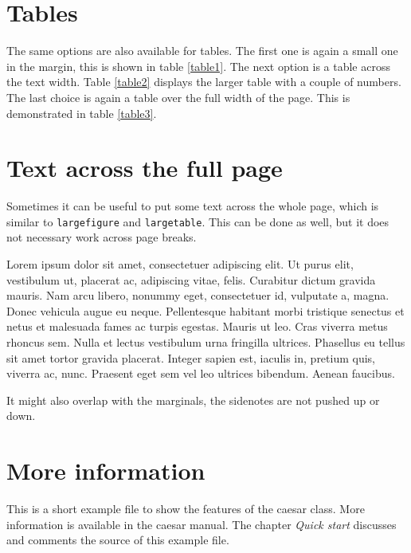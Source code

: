 \documentclass[]{caesar_book}
\begin{document}
\section{Tables}
The same options are also available for tables.%
%
%
The first one is again a small one in the margin, this is shown in table \ref{table1}. The next option is a table across the text width. %
%
%
Table \ref{table2} displays the larger table with a couple of numbers. The last choice is again a table over the full width of the page. This is demonstrated in table \ref{table3}.
%
%
%
\section{Text across the full page}
Sometimes it can be useful to put some text across the whole page, which is similar to \texttt{largefigure} and \texttt{largetable}. This can be done as well, but it does not necessary work across page breaks.

\begin{fullwidth}
Lorem ipsum dolor sit amet, consectetuer adipiscing elit. Ut purus elit, vestibulum ut, placerat ac, adipiscing vitae, felis. Curabitur dictum gravida mauris. Nam arcu libero, nonummy eget, consectetuer id, vulputate a, magna. Donec vehicula augue eu neque. Pellentesque habitant morbi tristique senectus et netus et malesuada fames ac turpis egestas. Mauris ut leo. Cras viverra metus rhoncus sem. Nulla et lectus vestibulum urna fringilla ultrices. Phasellus eu tellus sit amet tortor gravida placerat. Integer sapien est, iaculis in, pretium quis, viverra ac, nunc. Praesent eget sem vel leo ultrices bibendum. Aenean faucibus. 
\end{fullwidth}
%
It might also overlap with the marginals, the sidenotes are not pushed up or down.
%
\section{More information}
This is a short example file to show the features of the caesar class. More information is available in the caesar manual. The chapter \textit{Quick start} discusses and comments the source of this example file. 
%
 \printbibliography[heading=bibintoc]
\end{document}
